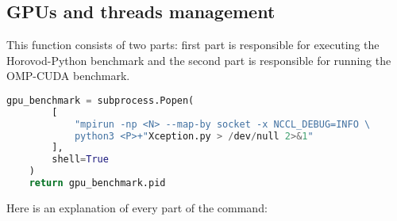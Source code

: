 \subsection{GPUs and threads management}

This function consists of two parts: first part is responsible for executing
the Horovod-Python benchmark and the second part is responsible for running
the OMP-CUDA benchmark.

\begin{lstlisting}[language=Python]
    gpu_benchmark = subprocess.Popen(
        [
            "mpirun -np <N> --map-by socket -x NCCL_DEBUG=INFO \
            python3 <P>+"Xception.py > /dev/null 2>&1"
        ],
        shell=True
    )
    return gpu_benchmark.pid
\end{lstlisting}

Here is an explanation of every part of the command:

